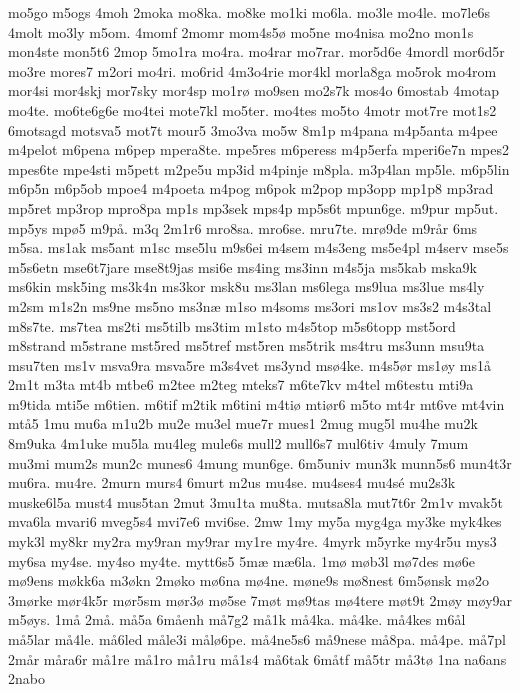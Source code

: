 mo5go
m5ogs
4moh
2moka
mo8ka.
mo8ke
mo1ki
mo6la.
mo3le
mo4le.
mo7le6s
4molt
mo3ly
m5om.
4momf
2momr
mom4s5^^f8
mo5ne
mo4nisa
mo2no
mon1s
mon4ste
mon5t6
2mop
5mo1ra
mo4ra.
mo4rar
mo7rar.
mor5d6e
4mordl
mor6d5r
mo3re
mores7
m2ori
mo4ri.
mo6rid
4m3o4rie
mor4kl
morla8ga
mo5rok
mo4rom
mor4si
mor4skj
mor7sky
mor4sp
mo1r^^f8
mo9sen
mo2s7k
mos4o
6mostab
4motap
mo4te.
mo6te6g6e
mo4tei
mote7kl
mo5ter.
mo4tes
mo5to
4motr
mot7re
mot1s2
6motsagd
motsva5
mot7t
mour5
3mo3va
mo5w
8m1p
m4pana
m4p5anta
m4pee
m4pelot
m6pena
m6pep
mpera8te.
mpe5res
m6peress
m4p5erfa
mperi6e7n
mpes2
mpes6te
mpe4sti
m5pett
m2pe5u
mp3id
m4pinje
m8pla.
m3p4lan
mp5le.
m6p5lin
m6p5n
m6p5ob
mpoe4
m4poeta
m4pog
m6pok
m2pop
mp3opp
mp1p8
mp3rad
mp5ret
mp3rop
mpro8pa
mp1s
mp3sek
mps4p
mp5s6t
mpun6ge.
m9pur
mp5ut.
mp5ys
mp^^f85
m9p^^e5.
m3q
2m1r6
mro8sa.
mro6se.
mru7te.
mr^^f89de
m9r^^e5r
6ms
m5sa.
ms1ak
ms5ant
m1sc
mse5lu
m9s6ei
m4sem
m4s3eng
ms5e4pl
m4serv
mse5s
m5s6etn
mse6t7jare
mse8t9jas
msi6e
ms4ing
ms3inn
m4s5ja
ms5kab
mska9k
ms6kin
msk5ing
ms3k4n
ms3kor
msk8u
ms3lan
ms6lega
ms9lua
ms3lue
ms4ly
m2sm
m1s2n
ms9ne
ms5no
ms3n^^e6
m1so
m4soms
ms3ori
ms1ov
ms3s2
m4s3tal
m8s7te.
ms7tea
ms2ti
ms5tilb
ms3tim
m1sto
m4s5top
m5s6topp
mst5ord
m8strand
m5strane
mst5red
ms5tref
mst5ren
ms5trik
ms4tru
ms3unn
msu9ta
msu7ten
ms1v
msva9ra
msva5re
m3s4vet
ms3ynd
ms^^f84ke.
m4s5^^f8r
ms1^^f8y
ms1^^e5
2m1t
m3ta
mt4b
mtbe6
m2tee
m2teg
mteks7
m6te7kv
m4tel
m6testu
mti9a
m9tida
mti5e
m6tien.
m6tif
m2tik
m6tini
m4ti^^f8
mti^^f8r6
m5to
mt4r
mt6ve
mt4vin
mt^^e55
1mu
mu6a
m1u2b
mu2e
mu3el
mue7r
mues1
2mug
mug5l
mu4he
mu2k
8m9uka
4m1uke
mu5la
mu4leg
mule6s
mull2
mull6s7
mul6tiv
4muly
7mum
mu3mi
mum2s
mun2c
munes6
4mung
mun6ge.
6m5univ
mun3k
munn5s6
mun4t3r
mu6ra.
mu4re.
2murn
murs4
6murt
m2us
mu4se.
mu4ses4
mu4s^^e9
mu2s3k
muske6l5a
must4
mus5tan
2mut
3mu1ta
mu8ta.
mutsa8la
mut7t6r
2m1v
mvak5t
mva6la
mvari6
mveg5s4
mvi7e6
mvi6se.
2mw
1my
my5a
myg4ga
my3ke
myk4kes
myk3l
my8kr
my2ra
my9ran
my9rar
my1re
my4re.
4myrk
m5yrke
my4r5u
mys3
my6sa
my4se.
my4so
my4te.
mytt6s5
5m^^e6
m^^e66la.
1m^^f8
m^^f8b3l
m^^f87des
m^^f86e
m^^f89ens
m^^f8kk6a
m3^^f8kn
2m^^f8ko
m^^f86na
m^^f84ne.
m^^f8ne9s
m^^f88nest
6m5^^f8nsk
m^^f82o
3m^^f8rke
m^^f8r4k5r
m^^f8r5sm
m^^f8r3^^f8
m^^f85se
7m^^f8t
m^^f89tas
m^^f84tere
m^^f8t9t
2m^^f8y
m^^f8y9ar
m5^^f8ys.
1m^^e5
2m^^e5.
m^^e55a
6m^^e5enh
m^^e57g2
m^^e51k
m^^e54ka.
m^^e54ke.
m^^e54kes
m6^^e5l
m^^e55lar
m^^e54le.
m^^e56led
m^^e5le3i
m^^e5l^^f86pe.
m^^e54ne5s6
m^^e59nese
m^^e58pa.
m^^e54pe.
m^^e57pl
2m^^e5r
m^^e5ra6r
m^^e51re
m^^e51ro
m^^e51ru
m^^e51s4
m^^e56tak
6m^^e5tf
m^^e55tr
m^^e53t^^f8
1na
na6ans
2nabo

